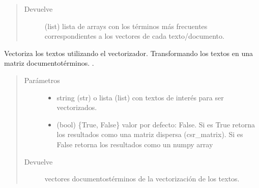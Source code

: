 \documentclass[letterpaper,10pt,openany,spanish]{sphinxmanual}
\begin{document}
\begin{fulllineitems}
\begin{fulllineitems}
\begin{quote}
\begin{description}
\item[{Devuelve}] \leavevmode
(list) lista de arrays con los términos más frecuentes 
correspondientes a los vectores de cada texto/documento.

\end{description}\end{quote}

\end{fulllineitems}


\begin{fulllineitems}
\label{\detokenize{funciones/vectorizacion:vectorizacion.VectorizadorFrecuencias.transform}}
Vectoriza los textos utilizando el vectorizador. 
Transformando los textos en una matriz documento\sphinxhyphen{}términos. 
.
\begin{quote}\begin{description}
\item[{Parámetros}] \leavevmode\begin{itemize}
\item {} 
 \textendash{} string (str) o lista (list) con textos de interés 
para ser vectorizados.

\item {} 
 \textendash{} (bool) \{True, False\} valor por defecto: False. 
Si es True retorna los resultados como una matriz dispersa 
(csr\_matrix). Si es False retorna los resultados como un numpy array

\end{itemize}

\item[{Devuelve}] \leavevmode
vectores documentos\sphinxhyphen{}términos de la vectorización de los textos.

\end{description}\end{quote}

\end{fulllineitems}



\end{fulllineitems}
\end{document}
